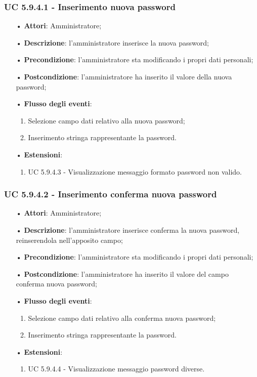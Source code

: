 \subsubsection{UC 5.9.4.1 - Inserimento nuova password}
\begin{itemize}
	\item[•]\textbf{Attori}: Amministratore;
	\item[•]\textbf{Descrizione}: l'amministratore inserisce la nuova password;
	\item[•]\textbf{Precondizione}: l'amministratore sta modificando i propri dati personali;
	\item[•]\textbf{Postcondizione}: l'amministratore ha inserito il valore della nuova password; 
	\item[•]\textbf{Flusso degli eventi}: 
	\begin{enumerate}
		\item Selezione campo dati relativo alla nuova password;
		\item Inserimento stringa rappresentante la password.
	\end{enumerate}
	\item[•]\textbf{Estensioni}:
	\begin{enumerate}
		\item UC 5.9.4.3 - Visualizzazione messaggio formato password non valido.
	\end{enumerate}
\end{itemize}

\subsubsection{UC 5.9.4.2 - Inserimento conferma nuova password}
\begin{itemize}
	\item[•]\textbf{Attori}: Amministratore;
	\item[•]\textbf{Descrizione}: l'amministratore inserisce conferma la nuova password, reinserendola nell'apposito campo;
	\item[•]\textbf{Precondizione}: l'amministratore sta modificando i propri dati personali;
	\item[•]\textbf{Postcondizione}: l'amministratore ha inserito il valore del campo conferma nuova password; 
	\item[•]\textbf{Flusso degli eventi}: 
	\begin{enumerate}
		\item Selezione campo dati relativo alla conferma nuova password;
		\item Inserimento stringa rappresentante la password.
	\end{enumerate}
	\item[•]\textbf{Estensioni}:
	\begin{enumerate}
		\item UC 5.9.4.4 - Visualizzazione messaggio password diverse.
	\end{enumerate}
\end{itemize}

